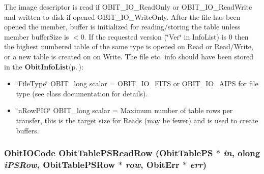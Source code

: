 The image descriptor is read if OBIT\_\-IO\_\-Read\-Only or OBIT\_\-IO\_\-Read\-Write and written to disk if opened OBIT\_\-IO\_\-Write\-Only. After the file has been opened the member, buffer is initialized for reading/storing the table unless member buffer\-Size is $<$0. If the requested version (\char`\"{}Ver\char`\"{} in Info\-List) is 0 then the highest numbered table of the same type is opened on Read or Read/Write, or a new table is created on on Write. The file etc. info should have been stored in the {\bf Obit\-Info\-List}{\rm (p.\,\pageref{structObitInfoList})}: \begin{itemize}
\item \char`\"{}File\-Type\char`\"{} OBIT\_\-long scalar = OBIT\_\-IO\_\-FITS or OBIT\_\-IO\_\-AIPS for file type (see class documentation for details). \item \char`\"{}n\-Row\-PIO\char`\"{} OBIT\_\-long scalar = Maximum number of table rows per transfer, this is the target size for Reads (may be fewer) and is used to create buffers. 
\end{itemize}
\subsubsection{\setlength{\rightskip}{0pt plus 5cm}Obit\-IOCode Obit\-Table\-PSRead\-Row ({\bf Obit\-Table\-PS} $\ast$ {\em in}, {\bf olong} {\em i\-PSRow}, {\bf Obit\-Table\-PSRow} $\ast$ {\em row}, {\bf Obit\-Err} $\ast$ {\em err})}\label{ObitTablePS_8h_a18}


